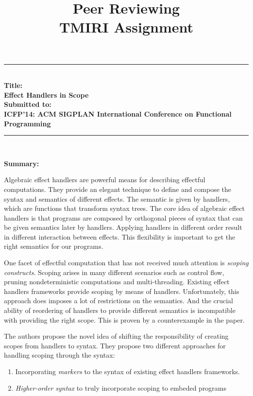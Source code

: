 \documentclass[12pt, a4paper]{article}
\title{%
  \vspace{-10ex}
  Peer Reviewing \\
  \small{TMIRI Assignment}
  \vspace{-15ex}
}
\date{} %
\newcommand{\myhline}[0]{\par\noindent\rule{\textwidth}{0.4pt}\\}
\newenvironment{lined}
    {
    \myhline
    }
    {
    \vspace{-4ex}
    \myhline
    }
\begin{document}
\maketitle

\begin{lined}
  \large
  \textbf{Title:\\\vspace{5mm} Effect Handlers in Scope} \\
  \textbf{Submitted to:\\\vspace{5mm} \scriptsize{ICFP'14: ACM SIGPLAN International Conference on Functional Programming}}
\end{lined}


{\normalsize \textbf{Summary:}}\label{sec:summary}

Algebraic effect handlers are powerful means for describing effectful computations. They provide an elegant technique to define and compose the syntax and semantics of different effects. The semantic is given by handlers, which are functions that transform syntax trees. The core idea of algebraic effect handlers is that programs are composed by orthogonal pieces of syntax that can be given semantics later by handlers. Applying handlers in different order result in different interaction between effects. This flexibility is important to get the right semantics for our programs.

One facet of effectful computation that has not received much attention is \textit{scoping constructs}. Scoping arises in many different scenarios such as control flow, pruning nondeterministic computations and multi-threading. Existing effect handlers frameworks provide scoping by means of handlers. Unfortunately, this approach does imposes a lot of restrictions on the semantics. And the crucial ability of reordering of handlers to provide different semantics is incompatible with providing the right scope. This is proven by a \mbox{counterexample} in the paper.

The authors propose the novel idea of shifting the responsibility of creating scopes from handlers to syntax. They propose two different approaches for handling scoping through the syntax:

\begin{enumerate}[label=(\alph*)]
    \item Incorporating \textit{markers} to the syntax of existing effect handlers frameworks.
    \item \textit{Higher-order syntax} to truly incorporate scoping to embeded programs
\end{enumerate}
\end{document}
